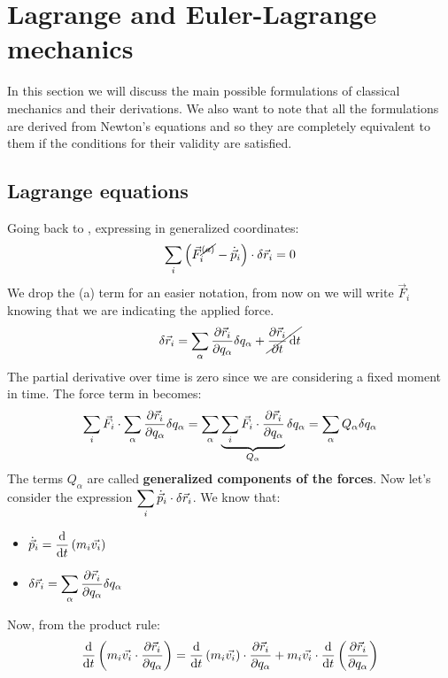 \chapter{Lagrange and Euler-Lagrange mechanics}
In this section we will discuss the main possible formulations of classical mechanics and their derivations. We also want to note that all the formulations are derived from Newton's equations and so they are completely equivalent to them if the conditions for their validity are satisfied.
\section{Lagrange equations}
Going back to \dalambertref, expressing in generalized coordinates:
\begin{equation}
    \displaystyle\sum_i \left(\vec{F}^{\cancel{(a)}}_i - \dot{\vec{p}}_i\right) \cdot \delta \vec{r}_i = 0
\end{equation}
We drop the (a) term for an easier notation, from now on we will write $\vec{F}_i$ knowing that we are indicating the applied force.
\begin{equation}
    \delta \vec{r}_i = \displaystyle\sum_{\alpha} \dfrac{\partial \vec{r}_i}{\partial q_{\alpha}} \delta q_{\alpha} + \cancel{\dfrac{\partial \vec{r}_i}{\partial t} \dd{t}}
\end{equation}
The partial derivative over time is zero since we are considering a fixed moment in time. The force term in \dalambertref\;becomes:
\begin{equation}
    \displaystyle\sum_i \vec{F}_i \cdot \displaystyle\sum_{\alpha} \dfrac{\partial \vec{r}_i}{\partial q_{\alpha}} \delta q_{\alpha} = \displaystyle\sum_{\alpha}\underbrace{\displaystyle\sum_{i} \vec{F}_i \cdot \dfrac{\partial \vec{r}_i}{\partial q_{\alpha}}}_{Q_{\alpha}} \delta q_{\alpha} = \displaystyle\sum_{\alpha}Q_{\alpha}\delta q_{\alpha}
\end{equation}
The terms $Q_{\alpha}$ are called \textbf{generalized components of the forces}.
Now let's consider the expression $\displaystyle\sum_i \dot{\vec{p}}_i \cdot \delta \vec{r}_i$. We know that:
\begin{itemize}
    \item $\dvec{p}_i = \dv{}{t}\brackets{m_i\vec{v_i}}$
    \item $\delta \vec{r}_i = \displaystyle\sum_{\alpha} \dfrac{\partial \vec{r}_i}{\partial q_{\alpha}}\delta q_{\alpha}$
\end{itemize}
Now, from the product rule:
\begin{equation} \label{e:total_deriv}
    \dv{}{t}\brackets{m_i\vec{v_i} \cdot \dfrac{\partial \vec{r}_i}{\partial q_{\alpha}}} = \dv{}{t}\brackets{m_i\vec{v_i}}\cdot \dfrac{\partial \vec{r}_i}{\partial q_{\alpha}} + m_i\vec{v_i} \cdot \dv{}{t}\brackets{\dfrac{\partial \vec{r}_i}{\partial q_{\alpha}}}
\end{equation}
